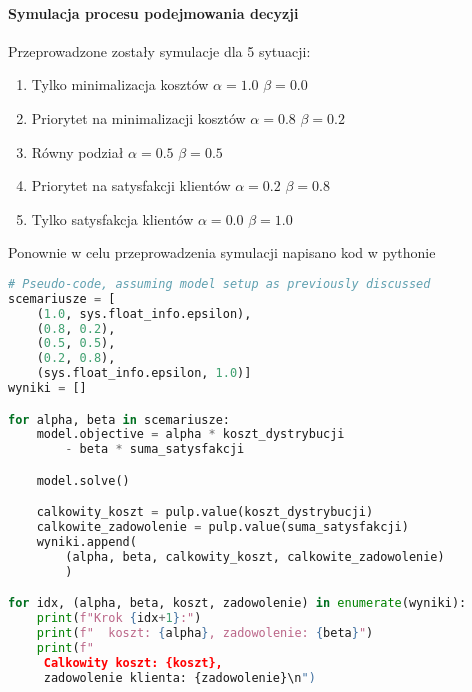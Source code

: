 \documentclass[12pt]{article}
\begin{document}
\paragraph{Symulacja procesu podejmowania decyzji}
Przeprowadzone zostały symulacje dla 5 sytuacji:
\begin{enumerate}
    \item Tylko minimalizacja kosztów $\alpha = 1.0$ $\beta = 0.0$
    \item Priorytet na minimalizacji kosztów $\alpha = 0.8$ $\beta = 0.2$
    \item Równy podział $\alpha = 0.5$ $\beta = 0.5$
    \item Priorytet na satysfakcji klientów $\alpha = 0.2$ $\beta = 0.8$
    \item Tylko satysfakcja klientów $\alpha = 0.0$ $\beta = 1.0$
\end{enumerate}

Ponownie w celu przeprowadzenia symulacji napisano kod w pythonie 
\begin{lstlisting}[language=Python]
# Pseudo-code, assuming model setup as previously discussed
scemariusze = [
    (1.0, sys.float_info.epsilon),
    (0.8, 0.2),
    (0.5, 0.5),
    (0.2, 0.8),
    (sys.float_info.epsilon, 1.0)]
wyniki = []

for alpha, beta in scemariusze:
    model.objective = alpha * koszt_dystrybucji
        - beta * suma_satysfakcji

    model.solve()

    calkowity_koszt = pulp.value(koszt_dystrybucji)
    calkowite_zadowolenie = pulp.value(suma_satysfakcji)
    wyniki.append(
        (alpha, beta, calkowity_koszt, calkowite_zadowolenie)
        )

for idx, (alpha, beta, koszt, zadowolenie) in enumerate(wyniki):
    print(f"Krok {idx+1}:")
    print(f"  koszt: {alpha}, zadowolenie: {beta}")
    print(f" 
     Calkowity koszt: {koszt}, 
     zadowolenie klienta: {zadowolenie}\n")
\end{lstlisting}

    
\end{document}
